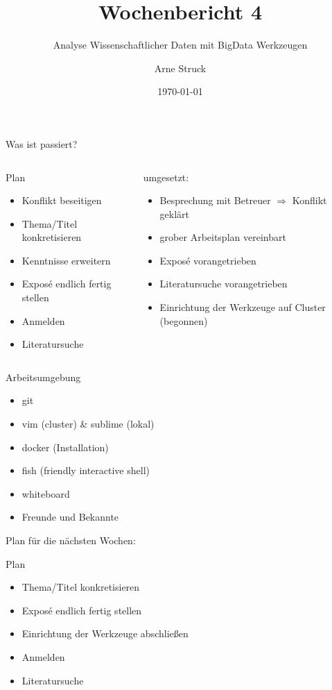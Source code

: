 \documentclass{beamer}
\title{Wochenbericht 4}
\subtitle{Analyse Wissenschaftlicher Daten mit BigData Werkzeugen}
\author{Arne Struck}
\institute{Universität Hamburg, Fachschaft Informatik, Abschlussarbeitenseminar}
\date{\today}
\begin{document}
\begin{frame}
\maketitle
\end{frame}

\begin{frame}{Was ist passiert?}
\begin{columns}[t]
    \begin{column}{.5\textwidth}      	
      	\begin{block}{Plan}
		\begin{itemize}
			\item Konflikt beseitigen
			\item Thema/Titel konkretisieren
			\item Kenntnisse erweitern
			\item Exposé endlich fertig stellen
			\item Anmelden
			\item Literatursuche
		\end{itemize}
		\end{block}
    \end{column}
	\begin{column}{.5\textwidth}
		\uncover<2> {
		\begin{block}{umgesetzt:}
        	\begin{itemize}
        		\item Besprechung mit Betreuer \(\Rightarrow\) Konflikt geklärt
	        	\item grober Arbeitsplan vereinbart
    	    		\item Exposé vorangetrieben
    	    		\item Literatursuche vorangetrieben
    	    		\item Einrichtung der Werkzeuge auf Cluster (begonnen)
        	\end{itemize}
		\end{block}
		}
	\end{column}
\end{columns}
\end{frame}

\begin{frame}{Arbeitsumgebung}
	\begin{itemize}
		\item git
		\item vim (cluster) \& sublime (lokal)
		\item docker (Installation)
		\item fish (friendly interactive shell)
		\item whiteboard
		\item Freunde und Bekannte
	\end{itemize}
\end{frame}


\begin{frame}{Plan für die nächsten Wochen:}
	\begin{block}{Plan}
		\begin{itemize}
			\item Thema/Titel konkretisieren
			\item Exposé endlich fertig stellen
			\item Einrichtung der Werkzeuge abschließen
			\item Anmelden
			\item Literatursuche
		\end{itemize}
	\end{block}
\end{frame}
\end{document}
